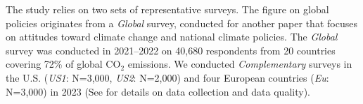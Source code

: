 \documentclass{nature}
\begin{document}

The study relies on two sets of representative surveys. 
The figure on global policies originates from a %
\textit{Global} survey, 
conducted for %
another paper that focuses on attitudes toward climate change and national climate policies.\cite{dechezlepretre_fighting_2022} %
The \textit{Global} survey was conducted in 2021--2022 on 40,680 respondents from 20 countries covering 72\% of global CO$_\text{2}$ emissions. 
We conducted 
\textit{Complementary} surveys in the U.S. (\textit{US1}: N=3,000, \textit{US2}: N=2,000) and four European countries (\textit{Eu}: N=3,000) %
in 2023 (See  for details on data collection and data quality).%
\end{document}
